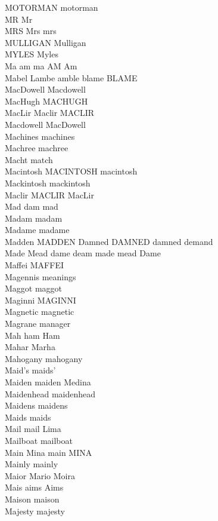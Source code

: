 MOTORMAN motorman\\
MR Mr\\
MRS Mrs mrs\\
MULLIGAN Mulligan\\
MYLES Myles\\
Ma am ma AM Am\\
Mabel Lambe amble blame BLAME\\
MacDowell Macdowell\\
MacHugh MACHUGH\\
MacLir Maclir MACLIR\\
Macdowell MacDowell\\
Machines machines\\
Machree machree\\
Macht match\\
Macintosh MACINTOSH macintosh\\
Mackintosh mackintosh\\
Maclir MACLIR MacLir\\
Mad dam mad\\
Madam madam\\
Madame madame\\
Madden MADDEN Damned DAMNED damned demand\\
Made Mead dame deam made mead Dame\\
Maffei MAFFEI\\
Magennis meanings\\
Maggot maggot\\
Maginni MAGINNI\\
Magnetic magnetic\\
Magrane manager\\
Mah ham Ham\\
Mahar Marha\\
Mahogany mahogany\\
Maid's maids'\\
Maiden maiden Medina\\
Maidenhead maidenhead\\
Maidens maidens\\
Maids maids\\
Mail mail Lima\\
Mailboat mailboat\\
Main Mina main MINA\\
Mainly mainly\\
Maior Mario Moira\\
Mais aims Aims\\
Maison maison\\
Majesty majesty\\
